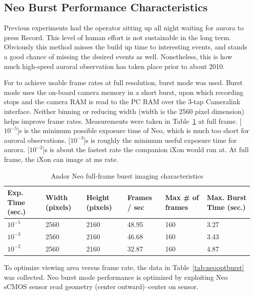 \subsection{Neo Burst Performance Characteristics}
Previous experiments \citep{dahlgren2013} had the operator sitting up all night waiting for aurora to press Record.
This level of human effort is not sustainable in the long term.
Obviously this method misses the build up time to interesting events, and stands a good chance of missing the desired events as well.
Nonetheless, this is how much high-speed auroral observation has taken place prior to about 2010.

For \citet{dahlgren2013} to achieve usable frame rates at full resolution, burst mode was used.
Burst mode uses the on-board camera memory in a short burst, upon which recording stops and the camera RAM is read to the PC RAM over the 3-tap Cameralink interface.
Neither binning or reducing width (width is the 2560 pixel dimension) helps improve frame rates.
Measurements were taken in Table~\ref{tab:neofullburst} at full frame.
\unit[$10^{-5}$]{s} is the minimum possible exposure time of Neo, which is much too short for auroral observations.
\unit[$10^{-3}$]{s} is roughly the minimum useful exposure time for aurora.
\unit[$10^{-2}$]{s} is about the fastest rate the companion iXon would run at. 
At full frame, the iXon can image at \unit[33]{ms} rate.
\begin{table}\centering
	\caption{Andor Neo full-frame burst imaging characteristics}\label{tab:neofullburst}
	\begin{tabular}{p{5em}p{4.5em}p{4.5em}p{5.5em}p{5em}p{5em}}
		\toprule
		Exp. Time (sec.) &  Width (pixels) & Height (pixels) &  Frames / sec &  Max \# of frames &  Max. Burst Time (sec.) \\
		\midrule
		$10^{-5}$ & 2560 & 2160 & 48.95 & 160 & 3.27 \\
		$10^{-3}$ & 2560 & 2160 & 46.68 & 160 & 3.43 \\
		$10^{-2}$ & 2560 & 2160 & 32.87 & 160 & 4.87 \\
		\bottomrule
	\end{tabular}
\end{table}
To optimize viewing area versus frame rate, the data in Table~\ref{tab:neooptburst} was collected.
Neo burst mode performance is optimized by exploiting Neo sCMOS sensor read geometry (center outward)--center on sensor.
